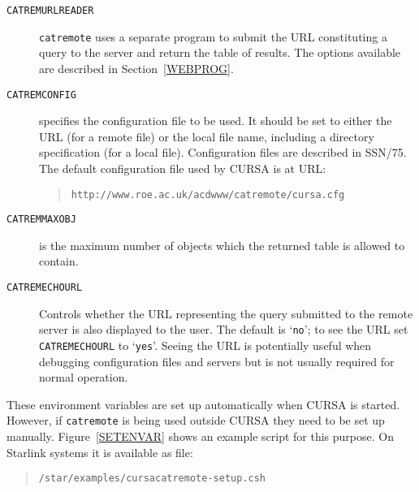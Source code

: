 \documentclass[twoside,11pt]{article}
\newcommand{\xref}[3]{#1}
\renewcommand{\_}{\texttt{\symbol{95}}}
\begin{document}
\begin{description}

  \item[{\tt CATREM\_URLREADER}] {\tt catremote} uses a separate program
   to submit the URL constituting a query to the server and return the
   table of results.  The options available are described in
   Section~\ref{WEBPROG}.

  \item[{\tt CATREM\_CONFIG}] specifies the configuration file to be used.
   It should be set to either the URL (for a remote file) or the local
   file name, including a directory specification (for a local file).
   Configuration files are described in \xref{SSN/75}{ssn75}{}\cite{SSN75}.
   The default configuration file used by CURSA is at URL:

  \begin{quote}
   {\tt http://www.roe.ac.uk/acdwww/catremote/cursa.cfg}
  \end{quote}

  \item[{\tt CATREM\_MAXOBJ}] is the maximum number of objects which the
   returned table is allowed to contain.

  \item[{\tt CATREM\_ECHOURL}] Controls whether the URL representing the
   query submitted to the remote server is also displayed to the user.
   The default is `{\tt no}'; to see the URL set {\tt CATREM\_ECHOURL} to
   `{\tt yes}'.  Seeing the URL is potentially useful when debugging
   configuration files and servers but is not usually required for
   normal operation.

\end{description}

These environment variables are set up automatically when CURSA is started.
However, if {\tt catremote} is being used outside CURSA they need to be
set up manually.  
Figure~\ref{SETENVAR} shows an example script for this purpose.  On
Starlink systems it is available as file:

\begin{quote}
{\tt /star/examples/cursacatremote-setup.csh}
\end{quote}
\end{document}
